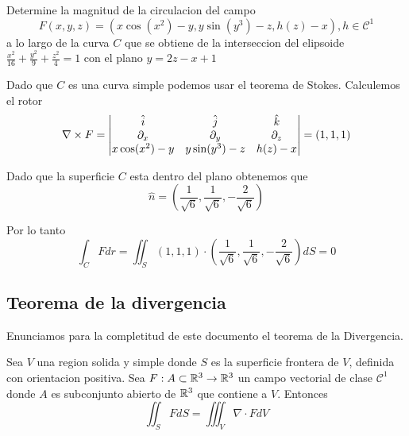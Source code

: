 \message{ !name(MAT024.tex)}\documentclass[../main.tex]{subfiles}
\begin{document}
\begin{problem}
  Determine la magnitud de la circulacion del campo
  \begin{equation*}
    F(x, y, z) = (x \cos(x^{2}) - y, y \sin(y^{3}) - z, h(z) - x), h \in \mathcal{C^{1}}
  \end{equation*}
  a lo largo de la curva $C$ que se obtiene de la interseccion del elipsoide $\frac{x^{2}}{16} + \frac{y^{2}}{9} + \frac{z^{2}}{4} = 1$ con el plano $y = 2z - x + 1$
\end{problem}
\begin{solution}
  Dado que $C$ es una curva simple podemos usar el teorema de Stokes. Calculemos el rotor
  \begin{equation*}
    \nabla \times F = \begin{vmatrix} \hat{i} & \hat{j} & \hat{k}\\ \partial_x & \partial_y & \partial_z\\ x \cos(x^{2}) - y & y \sin(y^{3}) - z & h(z) - x\end{vmatrix} = (1, 1, 1)
  \end{equation*}

  Dado que la superficie $C$ esta dentro del plano obtenemos que
  \begin{equation*}
    \hat{n} = (\frac{1}{\sqrt{6}}, \frac{1}{\sqrt{6}}, -\frac{2}{\sqrt{6}})
  \end{equation*}

  Por lo tanto
  \begin{equation*}
    \int_{C} F dr = \iint_{S} (1, 1, 1) \cdot (\frac{1}{\sqrt{6}}, \frac{1}{\sqrt{6}}, -\frac{2}{\sqrt{6}}) dS = 0
  \end{equation*}
\end{solution}

\subsection{Teorema de la divergencia}
Enunciamos para la completitud de este documento el teorema de la Divergencia.
\begin{teorema}[Divergencia]
  Sea $V$ una region solida y simple donde $S$ es la superficie frontera de $V$, definida con orientacion positiva. Sea $F: A \subset \mathbb{R}^{3} \to \mathbb{R}^{3}$ un campo vectorial de clase $\mathcal{C}^{1}$ donde $A$ es subconjunto abierto de $\mathbb{R}^{3}$ que contiene a $V$. Entonces
  \begin{equation*}
    \iint_{S} F dS = \iiint_{V} \nabla \cdot F dV
  \end{equation*}
\end{teorema}
\end{document}
